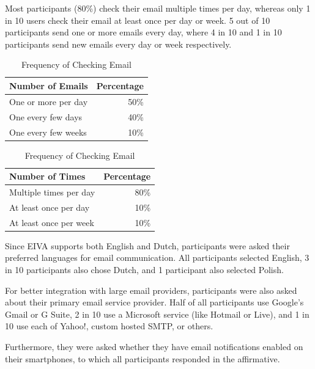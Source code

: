 \documentclass{article}
\begin{document}
Most participants (80\%) check their email multiple times per day, whereas only 1 in 10 users check their email at least once per day or week. 5 out of 10 participants send one or more emails every day, where 4 in 10 and 1 in 10 participants send new emails every day or week respectively.

\begin{table}[!htb]
	\begin{minipage}{.5\linewidth}
		\caption{Frequency of Emails Sent}
		\centering
		\begin{tabular}{lr}
			\hline
			\textbf{Number of Emails} & \textbf{Percentage} \\
			\hline
			One or more per day       & 50\%                \\
			One every few days        & 40\%                \\
			One every few weeks       & 10\%                \\
			\hline
		\end{tabular}
	\end{minipage}%
	\hspace{.1cm}
	\begin{minipage}{.5\linewidth}
		\centering
		\caption{Frequency of Checking Email}
		\begin{tabular}{lr}
			\hline
			\textbf{Number of Times} & \textbf{Percentage} \\
			\hline
			Multiple times per day   & 80\%                \\
			At least once per day    & 10\%                \\
			At least once per week   & 10\%                \\
			\hline
		\end{tabular}
	\end{minipage} 
\end{table}

Since EIVA supports both English and Dutch, participants were asked their preferred languages for email communication. All participants selected English, 3 in 10 participants also chose Dutch, and 1 participant also selected Polish.

For better integration with large email providers, participants were also asked about their primary email service provider. Half of all participants use Google's Gmail or G Suite, 2 in 10 use a Microsoft service (like Hotmail or Live), and 1 in 10 use each of Yahoo!, custom hosted SMTP, or others.

Furthermore, they were asked whether they have email notifications enabled on their smartphones, to which all participants responded in the affirmative.
\end{document}
